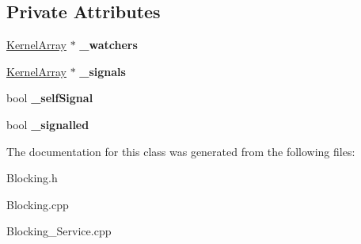 \subsection*{Private Attributes}
\begin{DoxyCompactItemize}
\item 
\mbox{\label{class_blockable_object_a5a4404223821f330f5f97cc0585ba7c3}} 
\hyperlink{class_kernel_array}{Kernel\+Array} $\ast$ {\bfseries \+\_\+watchers}
\item 
\mbox{\label{class_blockable_object_ac8a9b85723f7ac7ef5fd690625ea69d2}} 
\hyperlink{class_kernel_array}{Kernel\+Array} $\ast$ {\bfseries \+\_\+signals}
\item 
\mbox{\label{class_blockable_object_a254bf323d64eb40d9608ad695d451208}} 
bool {\bfseries \+\_\+self\+Signal}
\item 
\mbox{\label{class_blockable_object_a6765b0109ed6a6db6c5e78998dbcb5eb}} 
bool {\bfseries \+\_\+signalled}
\end{DoxyCompactItemize}


The documentation for this class was generated from the following files\+:\begin{DoxyCompactItemize}
\item 
Blocking.\+h\item 
Blocking.\+cpp\item 
Blocking\+\_\+\+Service.\+cpp\end{DoxyCompactItemize}
